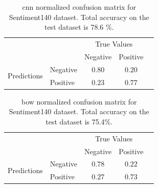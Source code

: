 \documentclass[12pt]{article}
\begin{document}
\begin{table}[!htbp]
	\centering
	\begin{tabular}{l|l|c|c|c}
		\multicolumn{2}{c}{}&\multicolumn{2}{c}{True Values}&\\
		\cline{3-4}
		\multicolumn{2}{c|}{}&Negative&Positive&\multicolumn{1}{c}{}\\
		\cline{2-4}
		\multirow{2}{*}{Predictions}& Negative & $0.80$ & $0.20$ & \\
		\cline{2-4}
		& Positive & $0.23$ & $0.77$ &\\
		\cline{2-4}
		
	\end{tabular}
	\caption{\ac{cnn} normalized confusion matrix for Sentiment140 dataset. Total accuracy on the test dataset is 78.6 \%.}
	\label{table:c_twitter}
\end{table}

\begin{table}[!htbp]
	\centering
\begin{tabular}{l|l|c|c|c}
	\multicolumn{2}{c}{}&\multicolumn{2}{c}{True Values}&\\
	\cline{3-4}
	\multicolumn{2}{c|}{}&Negative&Positive&\multicolumn{1}{c}{}\\
	\cline{2-4}
	\multirow{2}{*}{Predictions}& Negative & $0.78$ & $0.22$ & \\
	\cline{2-4}
	& Positive & $0.27$ & $0.73$ &\\
	\cline{2-4}

\end{tabular}
	\caption{\ac{bow} normalized confusion matrix for Sentiment140 dataset. Total accuracy on the test dataset is 75.4\%.}
	\label{table:b_twitter}
\end{table}





%
\end{document}
